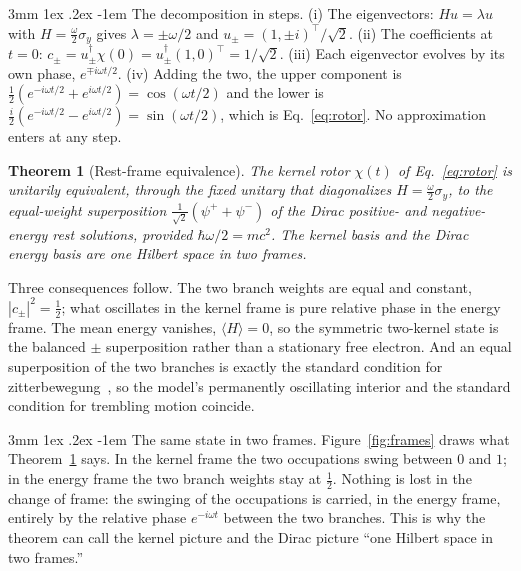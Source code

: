 \documentclass[%
 reprint, amsmath,amssymb, aps, prb, ]{revtex4-2}
\makeatletter
\numberwithin{equation}{section}
\newtheorem{theorem}{Theorem}[section]
\renewcommand\paragraph{%
  \@startsection{paragraph}{4}{\z@}%
    {3mm \@plus 1ex \@minus .2ex}
    {-1em}
    {\normalfont\normalsize\itshape}}
\makeatother
\begin{document}
\paragraph{The decomposition in steps.} (i) The eigenvectors: $H u=\lambda u$ with $H=\tfrac{\omega}{2}\sigma_y$ gives $\lambda=\pm\omega/2$ and $u_\pm=(1,\pm i)^\top/\sqrt2$. (ii) The coefficients at $t=0$: $c_\pm=u_\pm^\dagger\chi(0)=u_\pm^\dagger(1,0)^\top=1/\sqrt2$. (iii) Each eigenvector evolves by its own phase, $e^{\mp i\omega t/2}$. (iv) Adding the two, the upper component is $\tfrac12(e^{-i\omega t/2}+e^{i\omega t/2})=\cos(\omega t/2)$ and the lower is $\tfrac{i}{2}(e^{-i\omega t/2}-e^{i\omega t/2})=\sin(\omega t/2)$, which is Eq.~\eqref{eq:rotor}. No approximation enters at any step.

\begin{theorem}[Rest-frame equivalence]
\label{thm:equiv}
The kernel rotor $\chi(t)$ of Eq.~\eqref{eq:rotor} is unitarily equivalent, through the fixed unitary that diagonalizes $H=\tfrac{\omega}{2}\sigma_y$, to the equal-weight superposition $\tfrac{1}{\sqrt2}(\psi^{+}+\psi^{-})$ of the Dirac positive- and negative-energy rest solutions, provided $\hbar\omega/2=mc^2$. The kernel basis and the Dirac energy basis are one Hilbert space in two frames.
\end{theorem}

Three consequences follow. The two branch weights are equal and constant, $|c_\pm|^2=\tfrac12$; what oscillates in the kernel frame is pure relative phase in the energy frame. The mean energy vanishes, $\langle H\rangle=0$, so the symmetric two-kernel state is the balanced $\pm$ superposition rather than a stationary free electron. And an equal superposition of the two branches is exactly the standard condition for zitterbewegung~\cite{ref:schrodinger,ref:thaller}, so the model's permanently oscillating interior and the standard condition for trembling motion coincide.

\paragraph{The same state in two frames.} Figure~\ref{fig:frames} draws what Theorem~\ref{thm:equiv} says. In the kernel frame the two occupations swing between $0$ and $1$; in the energy frame the two branch weights stay at $\tfrac12$. Nothing is lost in the change of frame: the swinging of the occupations is carried, in the energy frame, entirely by the relative phase $e^{-i\omega t}$ between the two branches. This is why the theorem can call the kernel picture and the Dirac picture ``one Hilbert space in two frames.''
\end{document}
